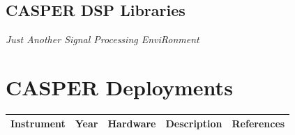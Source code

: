 \documentclass{ws-jai}
\begin{document}

\subsection{CASPER DSP Libraries}


\emph{Just Another Signal Processing EnviRonment}


\section{CASPER Deployments} \label{sec:Deployments}

\newcommand{\rr}{\raggedright}
\newcommand{\tn}{\tabularnewline}
\newcommand{\ac}{\centering}
\begin{landscape}
  \centering
  \begin{longtable}{p{3cm} c p{4cm} p{8cm} p{2cm}}
  \label{table:casper-instruments}
  \ac Instrument & \ac Year & \ac Hardware & \ac Description & \ac References \tn
  \hline

\end{longtable}
\end{landscape}
\end{document}
